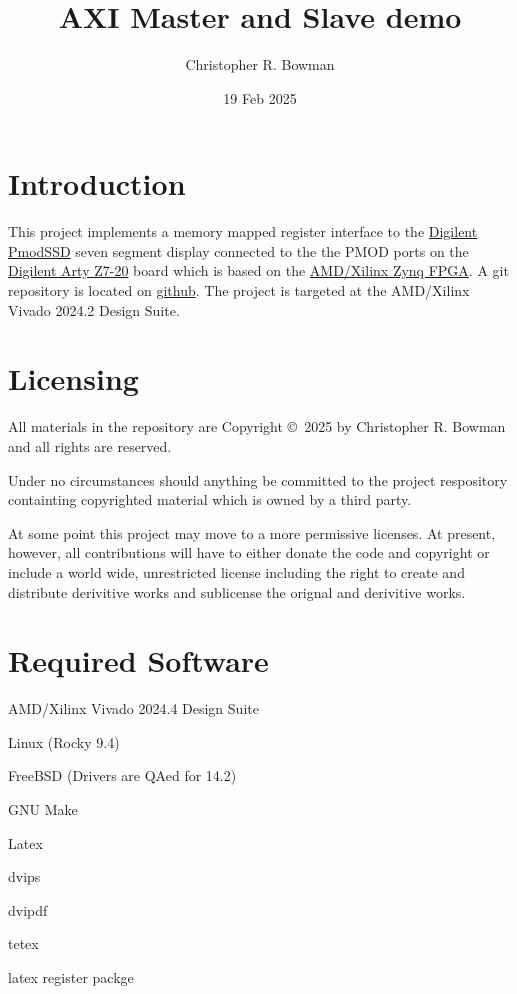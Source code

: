 \documentclass{report}
\title{AXI Master and Slave demo}
\author{Christopher R. Bowman}
\date{19 Feb 2025}
\begin{document}
\maketitle
\tableofcontents
\listoftables
\pagebreak
\pagestyle{headings}
\chapter{Introduction}
This project implements a memory mapped register interface to the 
\href{https://digilent.com/reference/pmod/pmodssd/reference-manual?redirect=1}
{Digilent PmodSSD} seven segment display connected to the the PMOD ports on the
\href{https://digilent.com/shop/arty-z7-zynq-7000-soc-development-board/}
{Digilent Arty Z7-20} board which is based on the
\href{https://www.amd.com/en/products/adaptive-socs-and-fpgas/soc/zynq-7000.html} {AMD/Xilinx Zynq FPGA}.
A git repository is located on
\href{https://gihub.com/}
{github}.
The project is targeted at the AMD/Xilinx Vivado 2024.2 Design Suite.

\chapter{Licensing}
All materials in the repository are Copyright \copyright\ 2025 by
Christopher R. Bowman and all rights are reserved.

Under no circumstances should anything be committed to the
project respository containting copyrighted material which is
owned by a third party.

At some point this project may move to a more permissive licenses.
At present, however, all contributions will have to either donate
the code and copyright or include a world wide, unrestricted
license including the right to create and distribute derivitive
works and sublicense the orignal and derivitive works.

\chapter{Required Software}
AMD/Xilinx Vivado 2024.4 Design Suite

Linux (Rocky 9.4)

FreeBSD (Drivers are QAed for 14.2)

GNU Make

Latex

dvips

dvipdf

tetex

latex register packge
\end{document}
